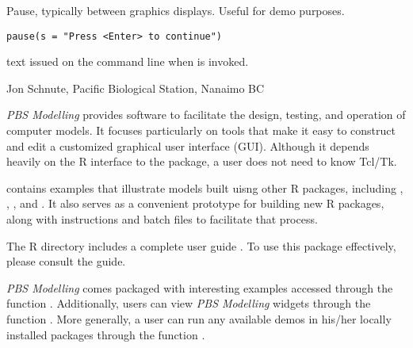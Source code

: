 \documentclass[letterpaper]{book}
\begin{document}
\begin{Description}\relax
Pause, typically between graphics displays. Useful for demo purposes.
\end{Description}
\begin{Usage}
\begin{verbatim}
pause(s = "Press <Enter> to continue")
\end{verbatim}
\end{Usage}
\begin{Arguments}
\begin{ldescription}
\item[\code{s}] text issued on the command line when  is invoked.
\end{ldescription}
\end{Arguments}
\begin{Author}\relax
Jon Schnute, Pacific Biological Station, Nanaimo BC
\end{Author}

\begin{Description}\relax
\emph{PBS Modelling} provides software to facilitate the design, 
testing, and operation of computer models. It focuses particularly on 
tools that make it easy to construct and edit a customized graphical 
user interface (GUI). Although it depends heavily on the R interface 
to the  package, a user does not need to know Tcl/Tk. 

 contains examples that illustrate models built uisng 
other R packages, including , , 
, and . 
It also serves as a convenient prototype for building new R packages, 
along with instructions and batch files to facilitate that process.

The R directory  includes a complete 
user guide . To use this package effectively, 
please consult the guide.

\emph{PBS Modelling} comes packaged with interesting examples accessed 
through the function .
Additionally, users can view \emph{PBS Modelling} widgets through the 
function . 
More generally, a user can run any available demos in his/her locally 
installed packages through the function .
\end{Description}
\end{document}
